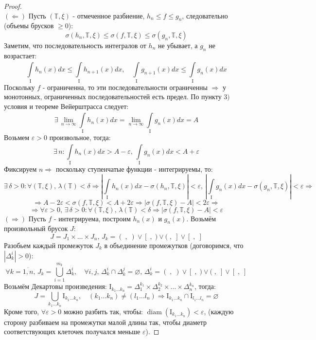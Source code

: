 \documentclass[12pt]{article}
\newcommand{\MTB}{\mathbb{T}}
\newcommand{\MI}{\mathrm{I}}
\newcommand{\VN}{\varnothing}
\newcommand{\VE}{\varepsilon}
\theoremstyle{definition}
\DeclareMathOperator{\diam}{\text{diam}}
\newcommand{\ddint}[2]{\displaystyle\int\limits_{#1}^{#2}}
\newcommand{\ovl}[1]{\overline{#1}}
\begin{document}
\begin{proof}\hfill\\
	$(\Leftarrow)$ Пусть $(\MTB,\xi)$ - отмеченное разбиение, $h_n \leq f \leq g_n$, следовательно (объемы брусков $\geq 0$):
	$$
		\sigma(h_n,\MTB,\xi) \leq \sigma(f,\MTB,\xi) \leq \sigma(g_n, \MTB, \xi) 
	$$
	Заметим, что последовательность интегралов от $h_n$ не убывает, а $g_n$ не возрастает:
	$$
		\ddint{\MI}{}h_n(x)dx \leq \ddint{\MI}{}h_{n+1}(x)dx, \quad \ddint{\MI}{}g_{n+1}(x)dx \leq \ddint{\MI}{}g_n(x)dx
	$$
	Поскольку $f$ - ограниченна, то эти последовательности ограниченны $\Rightarrow$ у монотонных, ограниченных последовательностей есть предел. По пункту $3)$ условия и теореме Вейерштрасса следует:
	$$
		\exists \, \lim\limits_{n \to \infty}\ddint{\MI}{}h_n(x)dx = \lim\limits_{n \to \infty}\ddint{\MI}{}g_n(x)dx = A
	$$
	Возьмем $\VE > 0$ произвольное, тогда: 
	$$
		\exists \, n \colon \ddint{\MI}{}h_n(x)dx > A - \VE, \, \ddint{\MI}{}g_n(x)dx < A + \VE
	$$
	Фиксируем $n \Rightarrow$ поскольку ступенчатые функции - интегрируемы, то:
	$$
	 	\exists \, \delta > 0 \colon \forall (\MTB, \xi) ,\, \lambda(\MTB) < \delta \Rightarrow \left|\ddint{\MI}{}h_n(x)dx - \sigma(h_n,\MTB,\xi)\right| < \VE, \, \left|\ddint{\MI}{}g_n(x)dx - \sigma(g_n,\MTB,\xi)\right| < \VE \Rightarrow
	$$
	$$
		\Rightarrow A - 2\VE < \sigma(f,\MTB,\xi) < A + 2\VE \Rightarrow |\sigma(f,\MTB,\xi) - A| < 2\VE \Rightarrow
	$$
	$$
		\Rightarrow \forall \VE >0, \, \exists \, \delta > 0 \colon \forall (\MTB,\xi), \, \lambda(\MTB) < \delta \Rightarrow |\sigma(f,\MTB,\xi) - A| < \VE
	$$
	$(\Rightarrow)$ Пусть $f$ - интегрируема, построим $h_n(x)$ и $g_n(x)$. Возьмём произвольный брусок $J$:
	$$
		J = J_1 \times \dots \times J_n, \, J_k = (\; , \;) \vee [\; ,\;) \vee (\; , \; ] \vee [\;, \;]
	$$
	Разобьем каждый промежуток $J_k$ в объединение промежутков (договоримся, что $|\Delta_k^i| > 0$):
	$$
		\forall k = \ovl{1,n}, \, J_k = \bigcup\limits_{i = 1}^{m_k}\Delta_k^i, \quad \forall i, j, \, \Delta_k^i \cap \Delta_k^j = \VN, \, \Delta_k^i = (\; , \;) \vee [\; ,\;) \vee (\; , \; ] \vee [\;, \;]
	$$
	Возьмём Декартовы произведения: $\MI_{k_1\dotsc k_n} = \Delta_1^{k_1}\times \Delta_2^{k_2} \times \dotsc \times \Delta_n^{k_n}$, тогда:
	$$
		J = \bigcup\limits_{k_1 \dotsc k_n}\MI_{k_1 \dotsc k_n}, \quad (k_1 \dotsc k_n) \neq (l_1 \dotsc l_n) \Rightarrow \MI_{k_1 \dotsc k_n} \cap \MI_{l_1 \dotsc l_n} = \VN
	$$
	Кроме того, $\forall \VE > 0$ можно разбить так, чтобы: $\diam(\MI_{k_1 \dotsc k_n}) < \VE$, (каждую сторону разбиваем на промежутки малой длины так, чтобы диаметр соответствующих клеточек получался меньше $\VE$).
	

\end{proof}
\end{document}
